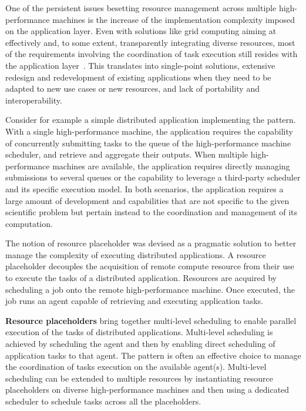 \documentclass{sig-alternate}
\begin{document}
One of the persistent issues besetting resource management across multiple
high-performance machines is the increase of the implementation complexity
imposed on the application layer. Even with solutions like grid computing aiming
at effectively and, to some extent, transparently integrating diverse resources,
most of the requirements involving the coordination of task execution still
resides with the application layer~\cite{legrand2003,krauter2002,darema2005}.
This translates into single-point solutions, extensive redesign and
redevelopment of existing applications when they need to be adapted to new use
cases or new resources, and lack of portability and interoperability.

Consider for example a simple distributed application implementing the \MW
pattern. With a single high-performance machine, the application requires the
capability of concurrently submitting tasks to the queue of the high-performance
machine scheduler, and retrieve and aggregate their outputs. When multiple
high-performance machines are available, the application requires directly
managing submissions to several queues or the capability to leverage a
third-party scheduler and its specific execution model. In both scenarios, the
application requires a large amount of development and capabilities that are not
specific to the given scientific problem but pertain instead to the coordination
and management of its computation.

The notion of resource placeholder was devised as a pragmatic solution to better
manage the complexity of executing distributed applications. A resource
placeholder decouples the acquisition of remote compute resource from their use
to execute the tasks of a distributed application. Resources are acquired by
scheduling a job onto the remote high-performance machine. Once executed, the
job runs an agent capable of retrieving and executing application tasks.


{\bf Resource placeholders} bring together multi-level scheduling to enable
parallel execution of the tasks of distributed applications. Multi-level
scheduling is achieved by scheduling the agent and then by enabling direct
scheduling of application tasks to that agent. The \MW pattern is often an
effective choice to manage the coordination of tasks execution on the available
agent(s).  Multi-level scheduling can be extended to multiple resources by
instantiating resource placeholders on diverse high-performance machines and
then using a dedicated scheduler to schedule tasks across all the placeholders.
\end{document}
